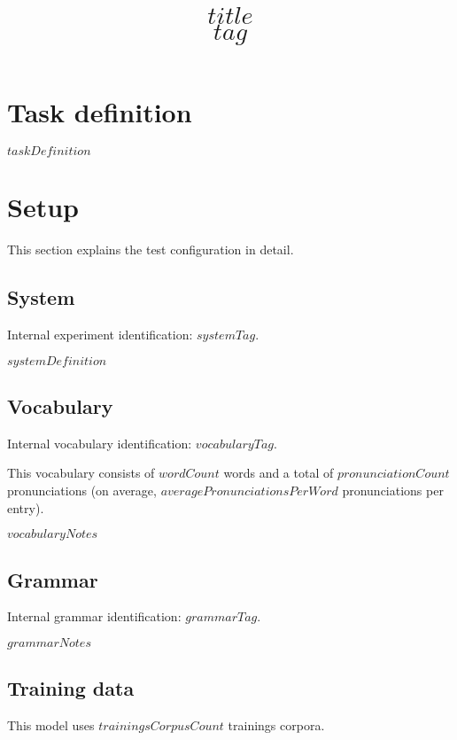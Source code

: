 \documentclass[a4paper,10pt,bibtotoc]{scrartcl}
\title{$title$\\$tag$}
\begin{document}
\maketitle

\begin{multicols}{2}

\tableofcontents


\section{Task definition}
$taskDefinition$

\section{Setup}
\label{sec:Setup}

This section explains the test configuration in detail.

\subsection{System}
\label{sec:System}

Internal experiment identification: $systemTag$.

$systemDefinition$

\subsection{Vocabulary}

Internal vocabulary identification: $vocabularyTag$.

This vocabulary consists of $wordCount$ words and a total of $pronunciationCount$ pronunciations (on average, $averagePronunciationsPerWord$ pronunciations per entry).

$vocabularyNotes$

\subsection{Grammar}

Internal grammar identification: $grammarTag$.

$grammarNotes$

\subsection{Training data}

This model uses $trainingsCorpusCount$ trainings corpora.


\end{multicols}
\end{document}
